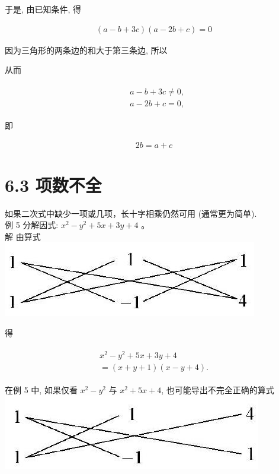 \documentclass[10pt]{article}
\begin{document}
于是, 由已知条件, 得

\begin{align*}
(a-b+3 c)(a-2 b+c)=0
\end{align*}

因为三角形的两条边的和大于第三条边, 所以

从而

\begin{align*}
\begin{aligned}
& a-b+3 c \neq 0, \\
& a-2 b+c=0,
\end{aligned}
\end{align*}

即

\begin{align*}
2 b=a+c
\end{align*}

\section*{6.3 项数不全}
如果二次式中缺少一项或几项，长十字相乘仍然可用 (通常更为简单).\\
例 5 分解因式: $x^{2}-y^{2}+5 x+3 y+4$ 。\\
解 由算式\\
\includegraphics[max width=\textwidth, center]{2024_10_30_bd799899fef40368a068g-044(1)}

得

\begin{align*}
\begin{gathered}
x^{2}-y^{2}+5 x+3 y+4 \\
=(x+y+1)(x-y+4) .
\end{gathered}
\end{align*}

在例 5 中, 如果仅看 $x^{2}-y^{2}$ 与 $x^{2}+5 x+4$, 也可能导出不完全正确的算式\\
\includegraphics[max width=\textwidth, center]{2024_10_30_bd799899fef40368a068g-044(2)}
\end{document}
